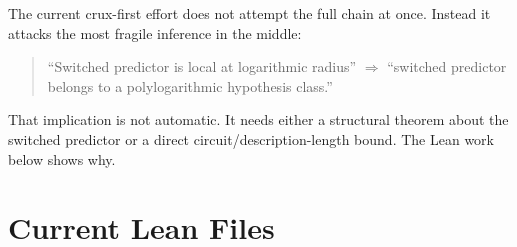 \documentclass[11pt]{article}
\theoremstyle{remark}
\begin{document}
The current crux-first effort does not attempt the full chain at once.  Instead it attacks the
most fragile inference in the middle:

\begin{quote}
``Switched predictor is local at logarithmic radius'' $\Longrightarrow$
``switched predictor belongs to a polylogarithmic hypothesis class.''
\end{quote}

That implication is not automatic.  It needs either a structural theorem about the switched
predictor or a direct circuit/description-length bound.  The Lean work below shows why.

\section{Current Lean Files}
\end{document}
